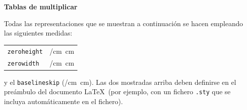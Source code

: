 \documentclass[svgnames,addpoints]{exam}
\makeatletter
\newlength{\zerowidth}
\newlength{\zeroheight}
\def\convertto#1#2{\strip@pt\dimexpr #2*65536/\number\dimexpr 1#1}
\makeatother
\begin{document}
{\Large\bf Tablas de multiplicar}

Todas las representaciones que se muestran a continuación se hacen
empleando las siguientes medidas:

\begin{center}
  \begin{tabular}{ll}
    \texttt{zeroheight}   & \convertto{cm}{\the\zeroheight}\ cm \\
    \texttt{zerowidth}    & \convertto{cm}{\the\zerowidth}\ cm \\
  \end{tabular}
\end{center}

\noindent
y el \texttt{baselineskip} (\convertto{cm}{\the\baselineskip}\
cm). Las dos mostradas arriba deben definirse en el preámbulo del
documento \LaTeX\ (por ejemplo, con un fichero \texttt{.sty} que se
incluya automáticamente en el fichero).
\end{document}
